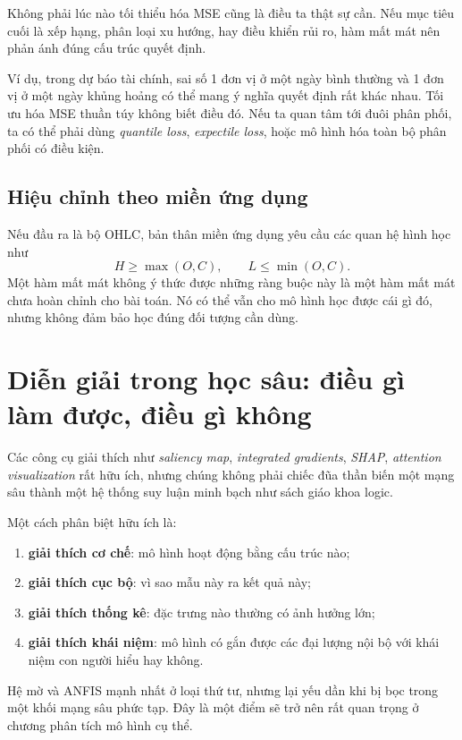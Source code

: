 Không phải lúc nào tối thiểu hóa MSE cũng là điều ta thật sự cần. Nếu mục tiêu cuối là xếp hạng, phân loại xu hướng, hay điều khiển rủi ro, hàm mất mát nên phản ánh đúng cấu trúc quyết định.

Ví dụ, trong dự báo tài chính, sai số 1 đơn vị ở một ngày bình thường và 1 đơn vị ở một ngày khủng hoảng có thể mang ý nghĩa quyết định rất khác nhau. Tối ưu hóa MSE thuần túy không biết điều đó. Nếu ta quan tâm tới đuôi phân phối, ta có thể phải dùng \emph{quantile loss}, \emph{expectile loss}, hoặc mô hình hóa toàn bộ phân phối có điều kiện.

\subsection{Hiệu chỉnh theo miền ứng dụng}

Nếu đầu ra là bộ OHLC, bản thân miền ứng dụng yêu cầu các quan hệ hình học như
\[
H\ge \max(O,C),\qquad L\le \min(O,C).
\]
Một hàm mất mát không ý thức được những ràng buộc này là một hàm mất mát chưa hoàn chỉnh cho bài toán. Nó có thể vẫn cho mô hình học được cái gì đó, nhưng không đảm bảo học đúng đối tượng cần dùng.

\section{Diễn giải trong học sâu: điều gì làm được, điều gì không}

Các công cụ giải thích như \emph{saliency map}, \emph{integrated gradients}, \emph{SHAP}, \emph{attention visualization} rất hữu ích, nhưng chúng không phải chiếc đũa thần biến một mạng sâu thành một hệ thống suy luận minh bạch như sách giáo khoa logic.

Một cách phân biệt hữu ích là:

\begin{enumerate}
\item \textbf{giải thích cơ chế}: mô hình hoạt động bằng cấu trúc nào;
\item \textbf{giải thích cục bộ}: vì sao mẫu này ra kết quả này;
\item \textbf{giải thích thống kê}: đặc trưng nào thường có ảnh hưởng lớn;
\item \textbf{giải thích khái niệm}: mô hình có gắn được các đại lượng nội bộ với khái niệm con người hiểu hay không.
\end{enumerate}

Hệ mờ và ANFIS mạnh nhất ở loại thứ tư, nhưng lại yếu dần khi bị bọc trong một khối mạng sâu phức tạp. Đây là một điểm sẽ trở nên rất quan trọng ở chương phân tích mô hình cụ thể.

